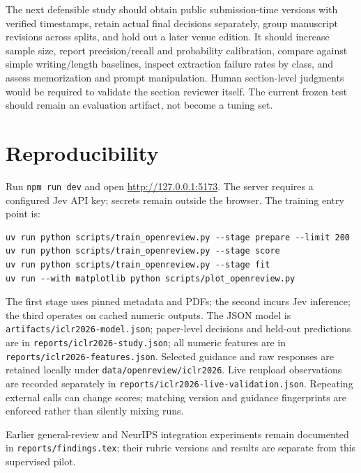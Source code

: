 \documentclass[11pt]{article}
\begin{document}
The next defensible study should obtain public submission-time versions with verified timestamps, retain actual final decisions separately, group manuscript revisions across splits, and hold out a later venue edition. It should increase sample size, report precision/recall and probability calibration, compare against simple writing/length baselines, inspect extraction failure rates by class, and assess memorization and prompt manipulation. Human section-level judgments would be required to validate the section reviewer itself. The current frozen test should remain an evaluation artifact, not become a tuning set.

\section{Reproducibility}
Run \texttt{npm run dev} and open \url{http://127.0.0.1:5173}. The server requires a configured Jev API key; secrets remain outside the browser. The training entry point is:
\begin{verbatim}
uv run python scripts/train_openreview.py --stage prepare --limit 200
uv run python scripts/train_openreview.py --stage score
uv run python scripts/train_openreview.py --stage fit
uv run --with matplotlib python scripts/plot_openreview.py
\end{verbatim}
The first stage uses pinned metadata and PDFs; the second incurs Jev inference; the third operates on cached numeric outputs. The JSON model is \texttt{artifacts/iclr2026-model.json}; paper-level decisions and held-out predictions are in \texttt{reports/iclr2026-study.json}; all numeric features are in \texttt{reports/iclr2026-features.json}. Selected guidance and raw responses are retained locally under \texttt{data/openreview/iclr2026}. Live reupload observations are recorded separately in \texttt{reports/iclr2026-live-validation.json}. Repeating external calls can change scores; matching version and guidance fingerprints are enforced rather than silently mixing runs.

Earlier general-review and NeurIPS integration experiments remain documented in \texttt{reports/findings.tex}; their rubric versions and results are separate from this supervised pilot.
\end{document}
